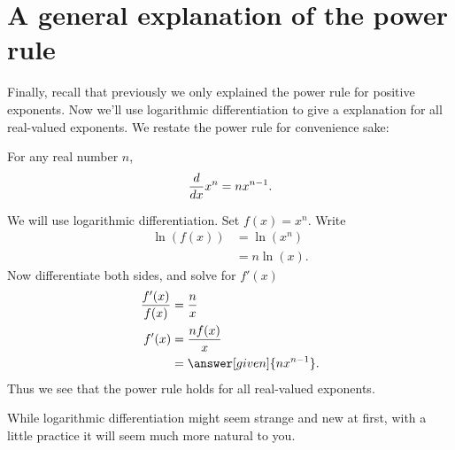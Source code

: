 \documentclass{ximera}
\begin{document}
\section{A general explanation of the power rule}


Finally, recall that previously we only explained the power rule for
positive exponents. Now we'll use logarithmic differentiation to give
a explanation for all real-valued exponents. We restate the power rule
for convenience sake:

\begin{theorem}
For any real number $n$, 
\[
\frac{d}{\mathop{}\!d x} x^n = n x^{n-1}.
\]
\begin{explanation}
We will use logarithmic differentiation. Set $f(x) = x^n$. Write
\begin{align*}
\ln(f(x)) &= \ln\left(x^n\right) \\ 
&= n\ln(x).
\end{align*}
Now differentiate both sides, and solve for $f'(x)$
\begin{align*}
\frac{f'(x)}{f(x)} &= \frac{n}{x}\\
f'(x) &=\frac{n f(x)}{x}\\
&= \answer[given]{n x^{n-1}}.
\end{align*}
Thus we see that the power rule holds for all real-valued exponents.
\end{explanation}
\end{theorem}

While logarithmic differentiation might seem strange and new at
first, with a little practice it will seem much more natural to you.
\end{document}
